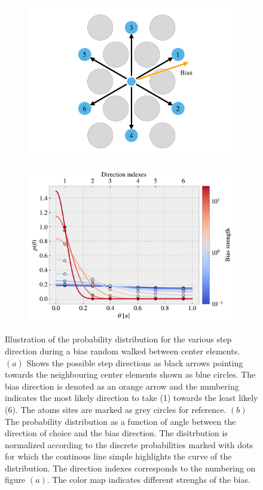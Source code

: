 \begin{figure}[H]
  \centering
  \begin{subfigure}[t]{0.48\textwidth}
      \centering
      \includegraphics[width=\textwidth]{figures/system/bias_prob_a.pdf}
      \caption{}
      \label{fig:bias_prob_a}
    \end{subfigure}
    \hfill
    \begin{subfigure}[t]{0.48\textwidth}
      \centering
      \includegraphics[width=\textwidth]{figures/system/bias_prob_b.pdf}
      \caption{}
      \label{fig:bias_prob_b}
  \end{subfigure}
  \hfill
     \caption{Illustration of the probability distribution for the various step direction during a bias random walked between center elements. $(a)$ Shows the possible step directions as black arrows pointing towards the neighbouring center elements shown as blue circles. The bias direction is denoted as an orange arrow and the numbering indicates the most likely direction to take (1) towards the least likely (6). The atoms sites are marked as grey circles for reference. $(b)$ The probability distribution as a function of angle between the direction of choice and the bias direction. The disitrbution is normalized according to the discrete probabilities marked with dots for which the continous line simple highlights the curve of the distribution. The direction indexes corresponds to the numbering on figure $(a)$. The color map indicates different strenghs of the bias. }

\end{figure}
